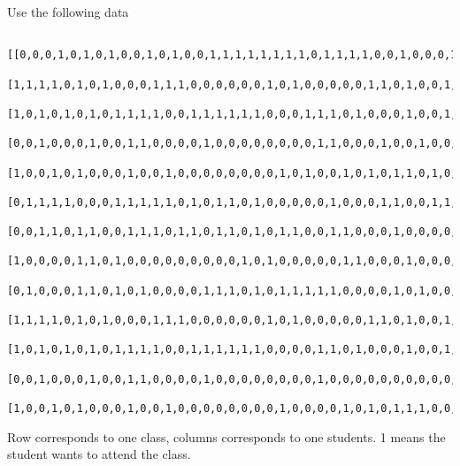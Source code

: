 \documentclass[11pt, oneside]{article}
\begin{document}
\begin{enumerate}
        Use the following data
        {
        \tiny
            \begin{verbatim}
                [[0,0,0,1,0,1,0,1,0,0,1,0,1,0,0,1,1,1,1,1,1,1,1,0,1,1,1,1,0,0,1,0,0,0,1,1,1,1,1,1,0,1,1,1,1,1,1,0,0,1,0,1,0,0],
                [1,1,1,1,0,1,0,1,0,0,0,1,1,1,0,0,0,0,0,0,1,0,1,0,0,0,0,0,1,1,0,1,0,0,1,0,0,0,1,0,1,0,1,0,0,0,0,1,0,0,1,1,1,0],
                [1,0,1,0,1,0,1,0,1,1,1,1,0,0,1,1,1,1,1,1,0,0,0,1,1,1,0,1,0,0,0,1,0,0,1,1,0,1,1,1,0,1,1,1,1,1,0,0,0,1,1,0,0,0],
                [0,0,1,0,0,0,1,0,0,1,1,0,0,0,0,1,0,0,0,0,0,0,0,0,1,1,0,0,0,1,0,0,1,0,0,0,1,0,0,0,0,0,0,0,1,1,1,0,1,1,0,0,0,0],
                [1,0,0,1,0,1,0,0,0,1,0,0,1,0,0,0,0,0,0,0,0,1,0,1,0,0,1,0,1,0,1,1,0,1,0,0,0,0,0,0,0,0,0,0,0,0,0,0,1,0,0,0,1,0],
                [0,1,1,1,1,0,0,0,1,1,1,1,1,0,1,0,1,1,0,1,0,0,0,0,0,1,0,0,0,1,1,0,0,1,1,0,1,1,1,1,0,0,0,1,1,1,1,0,0,1,0,1,0,1],
                [0,0,1,1,0,1,1,0,0,1,1,1,0,1,1,0,1,1,0,1,0,1,1,0,0,1,1,0,0,0,1,0,0,0,0,0,0,1,0,0,0,0,1,1,0,1,1,0,0,1,0,1,1,0],
                [1,0,0,0,0,1,1,0,1,0,0,0,0,0,0,0,0,0,1,0,1,0,0,0,0,0,1,1,0,0,0,1,0,0,0,1,0,0,0,0,0,0,1,0,1,0,1,0,1,0,0,0,0,0],
                [0,1,0,0,0,1,1,0,1,0,1,0,0,0,0,1,1,1,0,1,0,1,1,1,1,1,0,0,0,0,1,0,1,0,0,0,1,0,1,1,0,0,1,1,1,0,1,0,0,0,0,1,0,1],
                [1,1,1,1,0,1,0,1,0,0,0,1,1,1,0,0,0,0,0,0,1,0,1,0,0,0,0,0,1,1,0,1,0,0,1,0,0,0,1,0,1,0,1,0,0,0,0,1,0,0,1,1,1,0],
                [1,0,1,0,1,0,1,0,1,1,1,1,0,0,1,1,1,1,1,1,0,0,0,0,1,1,0,1,0,0,0,1,0,0,1,1,0,1,1,1,0,1,1,1,1,1,0,0,0,1,1,0,0,0],
                [0,0,1,0,0,0,1,0,0,1,1,0,0,0,0,1,0,0,0,0,0,0,0,0,1,0,0,0,0,0,0,0,0,0,0,0,1,0,0,0,0,0,0,0,1,1,1,0,1,1,0,0,0,0],
                [1,0,0,1,0,1,0,0,0,1,0,0,1,0,0,0,0,0,0,0,0,1,0,0,0,0,1,0,1,0,1,1,1,0,0,0,0,0,0,0,0,0,0,0,0,0,0,0,1,0,0,0,1,0]]
            \end{verbatim}
        }
        Row corresponds to one class, columns corresponds to one students.
        1 means the student wants to attend the class.

\end{enumerate}
\end{document}
